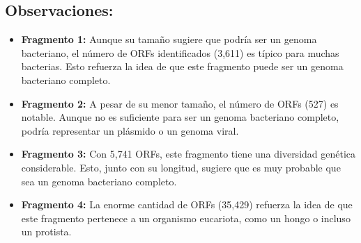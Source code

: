 \subsection*{Observaciones:}
\begin{itemize}
\item \textbf{Fragmento 1:} Aunque su tamaño sugiere que podría ser un genoma bacteriano, el número de ORFs identificados (3,611) es típico para muchas bacterias. Esto refuerza la idea de que este fragmento puede ser un genoma bacteriano completo.
\item \textbf{Fragmento 2:} A pesar de su menor tamaño, el número de ORFs (527) es notable. Aunque no es suficiente para ser un genoma bacteriano completo, podría representar un plásmido o un genoma viral.
\item \textbf{Fragmento 3:} Con 5,741 ORFs, este fragmento tiene una diversidad genética considerable. Esto, junto con su longitud, sugiere que es muy probable que sea un genoma bacteriano completo.
\item \textbf{Fragmento 4:} La enorme cantidad de ORFs (35,429) refuerza la idea de que este fragmento pertenece a un organismo eucariota, como un hongo o incluso un protista.
\end{itemize}
